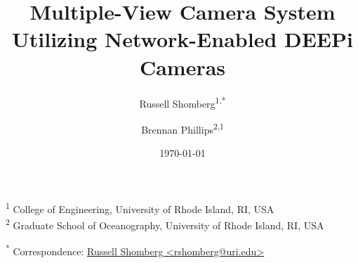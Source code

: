 \documentclass[
  10pt,
  draftcls,
  technote,
  letterpaper,
  oneside,
  onecolumn]{IEEEtran}
\title{Multiple-View Camera System Utilizing Network-Enabled DEEPi
Cameras}
\author{Russell Shomberg\textsuperscript{1,*} \and Brennan Phillips\textsuperscript{2,1}}
\date{\today}
\providecommand{\tightlist}{%
  \setlength{\itemsep}{0pt}\setlength{\parskip}{0pt}}
\begin{document}
\maketitle
\begin{abstract}

\end{abstract}

\textsuperscript{1} College of Engineering, University of Rhode Island,
RI, USA\\
\textsuperscript{2} Graduate School of Oceanography, University of Rhode
Island, RI, USA

\textsuperscript{*} Correspondence:
\href{mailto:rshomberg@uri.edu}{Russell Shomberg
\textless{}rshomberg@uri.edu\textgreater{}}








\printbibliography


\end{document}
